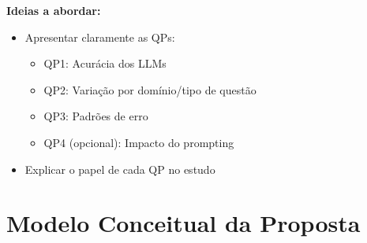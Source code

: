 \textbf{Ideias a abordar:}
\begin{itemize}
    \item Apresentar claramente as QPs:
    \begin{itemize}
        \item QP1: Acurácia dos LLMs
        \item QP2: Variação por domínio/tipo de questão
        \item QP3: Padrões de erro
        \item QP4 (opcional): Impacto do prompting
    \end{itemize}
    \item Explicar o papel de cada QP no estudo
\end{itemize}




\section{Modelo Conceitual da Proposta}
\label{subsec:modelo_conceitual}

